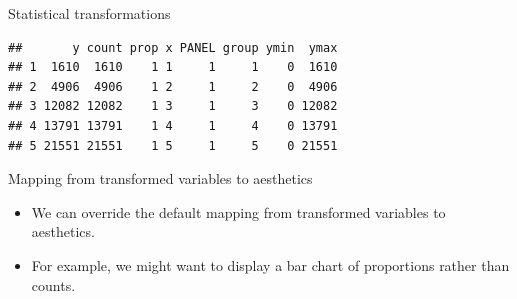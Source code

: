 \documentclass[ignorenonframetext,]{beamer}
\newenvironment{Shaded}{\begin{snugshade}}{\end{snugshade}}
\newcommand{\DataTypeTok}[1]{\textcolor[rgb]{0.13,0.29,0.53}{#1}}
\newcommand{\DecValTok}[1]{\textcolor[rgb]{0.00,0.00,0.81}{#1}}
\newcommand{\KeywordTok}[1]{\textcolor[rgb]{0.13,0.29,0.53}{\textbf{#1}}}
\newcommand{\NormalTok}[1]{#1}
\newcommand{\OperatorTok}[1]{\textcolor[rgb]{0.81,0.36,0.00}{\textbf{#1}}}
\newcommand{\StringTok}[1]{\textcolor[rgb]{0.31,0.60,0.02}{#1}}
\begin{document}
\begin{frame}[fragile]{Statistical transformations}
\protect\hypertarget{statistical-transformations-8}{}

\begin{Shaded}
\end{Shaded}

\begin{verbatim}
##       y count prop x PANEL group ymin  ymax
## 1  1610  1610    1 1     1     1    0  1610
## 2  4906  4906    1 2     1     2    0  4906
## 3 12082 12082    1 3     1     3    0 12082
## 4 13791 13791    1 4     1     4    0 13791
## 5 21551 21551    1 5     1     5    0 21551
\end{verbatim}

\end{frame}

\begin{frame}{Mapping from transformed variables to aesthetics}
\protect\hypertarget{mapping-from-transformed-variables-to-aesthetics}{}

\begin{itemize}
\item
  We can override the default mapping from transformed variables to
  aesthetics.
\item
  For example, we might want to display a bar chart of proportions
  rather than counts.
\end{itemize}

\end{frame}
\end{document}
